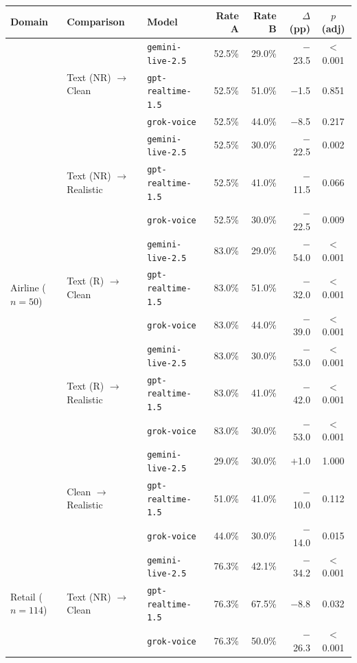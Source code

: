 \begin{tabular}{lllrrrc}
\toprule
{\textbf{Domain}} & \textbf{Comparison} & {\textbf{Model}} & \textbf{Rate A} & \textbf{Rate B} & \textbf{$\Delta$ (pp)} & \textbf{$p$ (adj)} \\
\midrule
\multirow{15}{*}{Airline ($n=50$)}
 & \multirow{3}{*}{Text (NR) $\to$ Clean} & {\texttt{gemini-live-2.5}} & 52.5\% & 29.0\% & $-$23.5 & $<$0.001 \\
 &  & {\texttt{gpt-realtime-1.5}} & 52.5\% & 51.0\% & $-$1.5 & 0.851 \\
 &  & {\texttt{grok-voice}} & 52.5\% & 44.0\% & $-$8.5 & 0.217 \\
\cmidrule(l){2-7}
 & \multirow{3}{*}{Text (NR) $\to$ Realistic} & {\texttt{gemini-live-2.5}} & 52.5\% & 30.0\% & $-$22.5 & 0.002 \\
 &  & {\texttt{gpt-realtime-1.5}} & 52.5\% & 41.0\% & $-$11.5 & 0.066 \\
 &  & {\texttt{grok-voice}} & 52.5\% & 30.0\% & $-$22.5 & 0.009 \\
\cmidrule(l){2-7}
 & \multirow{3}{*}{Text (R) $\to$ Clean} & {\texttt{gemini-live-2.5}} & 83.0\% & 29.0\% & $-$54.0 & $<$0.001 \\
 &  & {\texttt{gpt-realtime-1.5}} & 83.0\% & 51.0\% & $-$32.0 & $<$0.001 \\
 &  & {\texttt{grok-voice}} & 83.0\% & 44.0\% & $-$39.0 & $<$0.001 \\
\cmidrule(l){2-7}
 & \multirow{3}{*}{Text (R) $\to$ Realistic} & {\texttt{gemini-live-2.5}} & 83.0\% & 30.0\% & $-$53.0 & $<$0.001 \\
 &  & {\texttt{gpt-realtime-1.5}} & 83.0\% & 41.0\% & $-$42.0 & $<$0.001 \\
 &  & {\texttt{grok-voice}} & 83.0\% & 30.0\% & $-$53.0 & $<$0.001 \\
\cmidrule(l){2-7}
 & \multirow{3}{*}{Clean $\to$ Realistic} & {\texttt{gemini-live-2.5}} & 29.0\% & 30.0\% & $+$1.0 & 1.000 \\
 &  & {\texttt{gpt-realtime-1.5}} & 51.0\% & 41.0\% & $-$10.0 & 0.112 \\
 &  & {\texttt{grok-voice}} & 44.0\% & 30.0\% & $-$14.0 & 0.015 \\
\midrule
\multirow{15}{*}{Retail ($n=114$)}
 & \multirow{3}{*}{Text (NR) $\to$ Clean} & {\texttt{gemini-live-2.5}} & 76.3\% & 42.1\% & $-$34.2 & $<$0.001 \\
 &  & {\texttt{gpt-realtime-1.5}} & 76.3\% & 67.5\% & $-$8.8 & 0.032 \\
 &  & {\texttt{grok-voice}} & 76.3\% & 50.0\% & $-$26.3 & $<$0.001 \\

\end{tabular}
